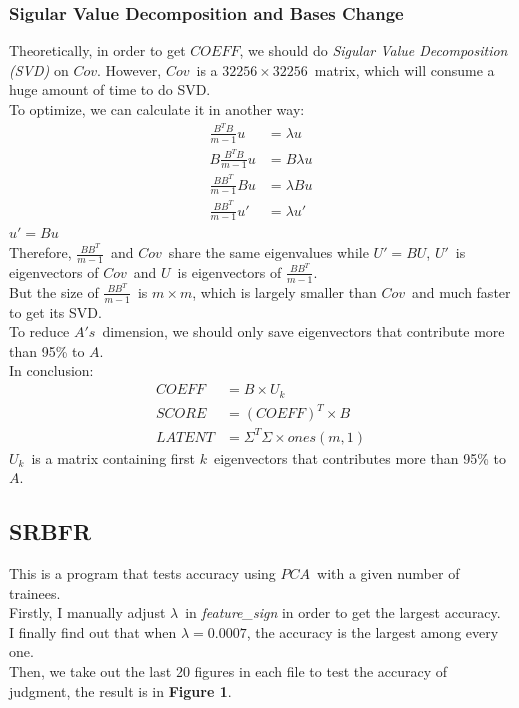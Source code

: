 \subsubsection{Sigular Value Decomposition and Bases Change}
Theoretically, in order to get \(COEFF\), we should do \emph{Sigular Value Decomposition (SVD)} on \(Cov\). However, \(Cov\)\ is a \(32256\times32256\)\ matrix, which will consume a huge amount of time to do SVD.
\\
To optimize, we can calculate it in another way:
\[
	\begin{split}
		\frac{B^{T}B}{m-1}u &= \lambda u
		\\
		B\frac{B^{T}B}{m-1}u &= B\lambda u
		\\
		\frac{BB^{T}}{m-1}Bu &= \lambda Bu
		\\
		\frac{BB^{T}}{m-1}u' &= \lambda u'
	\end{split}
\]
\(u' = Bu\)
\\
Therefore, \(\frac{BB^{T}}{m-1}\)\ and \(Cov\)\ share the same eigenvalues while \(U' = BU\), \(U'\)\ is eigenvectors of \(Cov\)\ and \(U\)\ is eigenvectors of \(\frac{BB^{T}}{m-1}\).
\\
But the size of \(\frac{BB^{T}}{m-1}\)\ is \(m\times m\), which is largely smaller than \(Cov\)\ and much faster to get its SVD.
\\
To reduce \(A's\)\ dimension, we should only save eigenvectors that contribute more than 95\% to \(A\).
\\
In conclusion:
\[
	\begin{split}
		COEFF &= B \times U_k
		\\
		SCORE &= (COEFF)^{T} \times B
		\\
		LATENT &= \Sigma^{T}\Sigma \times ones(m,1)
	\end{split}
\]
\(U_k\)\ is a matrix containing first \(k\)\ eigenvectors that contributes more than 95\% to \(A\).

\subsection{SRBFR}
This is a program that tests accuracy using \(PCA\)\ with a given number of trainees.
\\
Firstly, I manually adjust \(\lambda\)\ in \emph{feature\_sign} in order to get the largest accuracy.
\\
I finally find out that when \(\lambda=0.0007\), the accuracy is the largest among every one.
\\
Then, we take out the last 20 figures in each file to test the accuracy of judgment, the result is in \textbf{Figure 1}.

